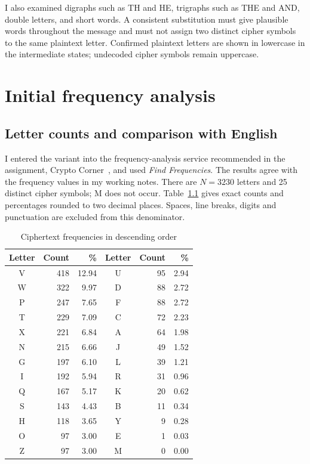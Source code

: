 \documentclass{tum_report}
\begin{document}
I also examined digraphs such as TH and HE, trigraphs such as THE and AND,
double letters, and short words. A consistent substitution must give
plausible words throughout the message and must not assign two distinct
cipher symbols to the same plaintext letter. Confirmed plaintext letters
are shown in lowercase in the intermediate states; undecoded cipher
symbols remain uppercase.

\clearpage
\chapter{Initial frequency analysis}
\section{Letter counts and comparison with English}
I entered the variant into the frequency-analysis service recommended in
the assignment, Crypto Corner~\cite{ref:tool}, and used \textit{Find Frequencies}.
The results agree with the frequency values in my working notes. There are
$N=3230$ letters and 25 distinct cipher symbols; M does not occur.
Table~\ref{tab:counts} gives exact counts and percentages rounded to two
decimal places. Spaces, line breaks, digits and punctuation are excluded
from this denominator.

\begin{table}[H]\caption{Ciphertext frequencies in descending order}
\label{tab:counts}\centering
\begin{tabular}{crr@{\hspace{1cm}}crr}\toprule
Letter & Count & \% & Letter & Count & \%\\\midrule
V & 418 & 12.94 & U & 95 & 2.94 \\
W & 322 & 9.97 & D & 88 & 2.72 \\
P & 247 & 7.65 & F & 88 & 2.72 \\
T & 229 & 7.09 & C & 72 & 2.23 \\
X & 221 & 6.84 & A & 64 & 1.98 \\
N & 215 & 6.66 & J & 49 & 1.52 \\
G & 197 & 6.10 & L & 39 & 1.21 \\
I & 192 & 5.94 & R & 31 & 0.96 \\
Q & 167 & 5.17 & K & 20 & 0.62 \\
S & 143 & 4.43 & B & 11 & 0.34 \\
H & 118 & 3.65 & Y & 9 & 0.28 \\
O & 97 & 3.00 & E & 1 & 0.03 \\
Z & 97 & 3.00 & M & 0 & 0.00 \\
\bottomrule\end{tabular}\end{table}
\end{document}
